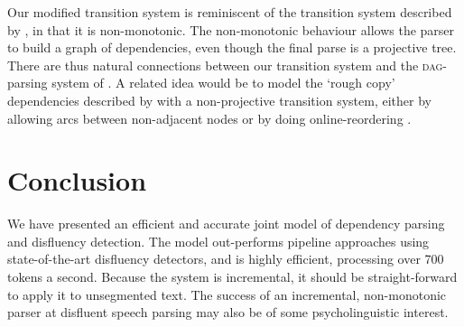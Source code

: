 \documentclass[11pt,letterpaper]{article}
\begin{document}
Our modified transition system is reminiscent
of the transition system described by \citet{honnibal:13}, in that it is
non-monotonic.  The non-monotonic behaviour allows the parser to build a graph of dependencies,
even though the final parse is a projective tree. There are thus natural connections
between our transition system and the \textsc{dag}-parsing system of \citet{sagae:08}.
A related idea would be to model the `rough copy' dependencies described by 
\citet{Johnson04a} with a non-projective transition system, either by allowing
arcs between non-adjacent nodes \citep{cohen:11} or by doing online-reordering
\citep{nivre:09}.


\section{Conclusion}

We have presented an efficient and accurate joint model of dependency parsing and
disfluency detection.  The model out-performs pipeline approaches using state-of-the-art
disfluency detectors, and is highly efficient, processing over 700 tokens a second.
Because the system is incremental, it should be straight-forward to apply it
to unsegmented text. The success of an incremental, non-monotonic parser at
disfluent speech parsing may also be of some psycholinguistic interest.



\end{document}

